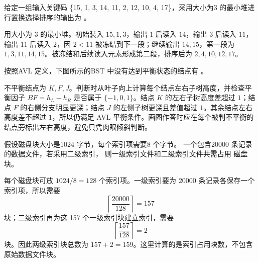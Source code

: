 \begin{question}
给定一组输入关键码 \{15,  1,  3,  14,  11,  2,  12,  10,  4,  17\}，采用大小为3 的最小堆进行置换选择排序的输出为 \blank。

\begin{solution}
用大小为 3 的最小堆。初始装入 $15,1,3$，输出 $1$ 后读入 $14$，输出 $3$ 后读入 $11$，输出 $11$ 后读入 $2$，因 $2<11$ 被冻结到下一段；继续输出 $14,15$，第一段为 $1,3,11,14,15$。被冻结和后续读入元素形成第二段，排序后为 $2,4,10,12,17$。
\end{solution}
\end{question}

\begin{question}
按照AVL 定义，下图所示的BST 中没有达到平衡状态的结点有 \blank。

\begin{center}
\end{center}
\begin{solution}
不平衡结点为 $K,F,J$。判断时从叶子向上计算每个结点左右子树高度，并检查平衡因子 $BF=h_L-h_R$ 是否属于 $\{-1,0,1\}$。结点 $K$ 的左右子树高度差超过 $1$；结点 $F$ 的右侧分支明显更深；结点 $J$ 的左侧子树更深且差值超过 $1$。其余结点左右高度差不超过 $1$，所以仍满足 AVL 平衡条件。画图作答时应在每个被判不平衡的结点旁标出左右高度，避免只凭肉眼倾斜判断。
\end{solution}
\end{question}

\begin{question}
假设磁盘块大小是1024 字节，每个索引项需要8 个字节。 一个包含20000 条记录的数据文件，若采用二级索引， 则一级索引文件和二级索引文件共需占用 \blank 磁盘块。

\begin{solution}
每个磁盘块可放 $1024/8=128$ 个索引项。一级索引要为 $20000$ 条记录各保存一个索引项，所以需要
\[
\left\lceil\frac{20000}{128}\right\rceil=157
\]
块；二级索引再为这 157 个一级索引块建立索引，需要
\[
\left\lceil\frac{157}{128}\right\rceil=2
\]
块。因此两级索引块总数为 $157+2=159$。这里计算的是索引占用块数，不包含原始数据文件块。
\end{solution}
\end{question}


